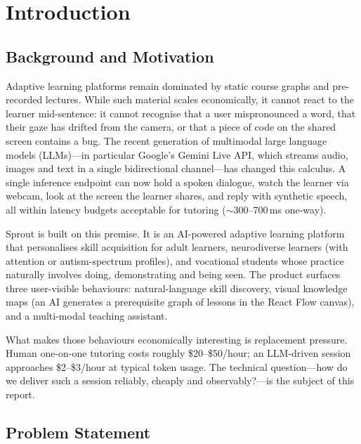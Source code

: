\chapter{Introduction}
\label{ch:intro}

\section{Background and Motivation}
\label{sec:background}

Adaptive learning platforms remain dominated by static course graphs and pre-recorded lectures. While such material scales economically, it cannot react to the learner mid-sentence: it cannot recognise that a user mispronounced a word, that their gaze has drifted from the camera, or that a piece of code on the shared screen contains a bug. The recent generation of multimodal large language models (LLMs)---in particular Google's Gemini Live API, which streams audio, images and text in a single bidirectional channel---has changed this calculus. A single inference endpoint can now hold a spoken dialogue, watch the learner via webcam, look at the screen the learner shares, and reply with synthetic speech, all within latency budgets acceptable for tutoring ($\sim$300--700\,ms one-way).

Sprout is built on this premise. It is an AI-powered adaptive learning platform that personalises skill acquisition for adult learners, neurodiverse learners (with attention or autism-spectrum profiles), and vocational students whose practice naturally involves doing, demonstrating and being seen. The product surfaces three user-visible behaviours: natural-language skill discovery, visual knowledge maps (an AI generates a prerequisite graph of lessons in the React Flow canvas), and a multi-modal teaching assistant.

What makes those behaviours economically interesting is replacement pressure. Human one-on-one tutoring costs roughly \$20--\$50/hour; an LLM-driven session approaches \$2--\$3/hour at typical token usage. The technical question---how do we deliver such a session reliably, cheaply and observably?---is the subject of this report.

\SproutSystemOverview

\section{Problem Statement}
\label{sec:problem}

